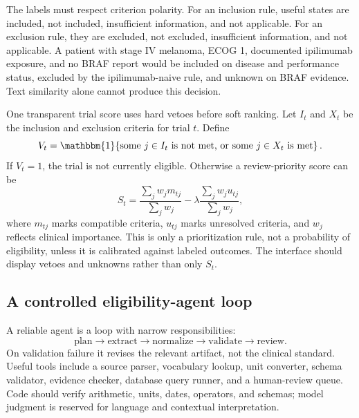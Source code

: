 \documentclass[12pt,oneside]{book}
\numberwithin{equation}{section}
\theoremstyle{definition}
\theoremstyle{plain}
\theoremstyle{remark}
\newcommand{\ind}{\mathbbm{1}}
\begin{document}
The labels must respect criterion polarity.  For an inclusion rule, useful
states are included, not included, insufficient information, and not
applicable.  For an exclusion rule, they are excluded, not excluded,
insufficient information, and not applicable.  A patient with stage IV
melanoma, ECOG 1, documented ipilimumab exposure, and no BRAF report would be
included on disease and performance status, excluded by the ipilimumab-naive
rule, and unknown on BRAF evidence.  Text similarity alone cannot produce this
decision.

One transparent trial score uses hard vetoes before soft ranking.  Let $I_t$
and $X_t$ be the inclusion and exclusion criteria for trial $t$.  Define
\[
  V_t=\ind\!\left\{
      \text{some }j\in I_t\text{ is not met, or some }j\in X_t\text{ is met}
  \right\}.
\]
If $V_t=1$, the trial is not currently eligible.  Otherwise a review-priority
score can be
\[
  S_t=\frac{\sum_j w_j m_{tj}}{\sum_j w_j}
      -\lambda\frac{\sum_j w_j u_{tj}}{\sum_j w_j},
\]
where $m_{tj}$ marks compatible criteria, $u_{tj}$ marks unresolved criteria,
and $w_j$ reflects clinical importance.  This is only a prioritization rule,
not a probability of eligibility, unless it is calibrated against labeled
outcomes.  The interface should display vetoes and unknowns rather than only
$S_t$.

\subsection{A controlled eligibility-agent loop}

A reliable agent is a loop with narrow responsibilities:
\[
 \text{plan}\longrightarrow\text{extract}\longrightarrow\text{normalize}
 \longrightarrow\text{validate}\longrightarrow\text{review}.
\]
On validation failure it revises the relevant artifact, not the clinical
standard.  Useful tools include a source parser, vocabulary lookup, unit
converter, schema validator, evidence checker, database query runner, and a
human-review queue.  Code should verify arithmetic, units, dates, operators,
and schemas; model judgment is reserved for language and contextual
interpretation.
\end{document}
